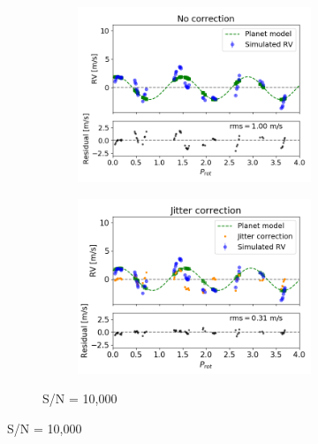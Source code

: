 \begin{figure}[tbp]	
\centering
    \begin{subfigure}[b]{1.0\textwidth}
    		\begin{subfigure}[b]{0.49\textwidth}
        		\includegraphics[width=\textwidth]{./Figures/Methods/Fitting_5-Fit2_SN10000.png}
		\end{subfigure}
		\begin{subfigure}[b]{0.49\textwidth}        		
        		\includegraphics[width=\textwidth]{./Figures/Methods/Fitting_5-Fit1_XY_SN10000.png}
        	\end{subfigure}
        	\caption{S/N = 10,000}
    \end{subfigure}	       

\end{figure}
